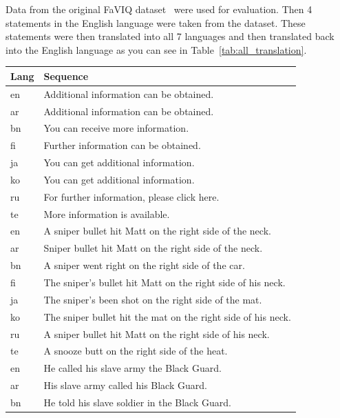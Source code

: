 Data from the original FaVIQ dataset~\cite{faviq} were used for evaluation. Then 4 statements in the English language were taken from the dataset. These statements were then translated into all 7 languages and then translated back into the English language as you can see in Table~\ref{tab:all_translation}.

\begin{table}[H]
    \centering
    \begin{tabular}{l|p{11cm}}
        \hline
        Lang & Sequence \\
        \hline
        en & Additional information can be obtained. \\
        \hline
        ar & Additional information can be obtained. \\
        bn & You can receive more information. \\
        fi & Further information can be obtained. \\
        ja & You can get additional information. \\
        ko & You can get additional information. \\
        ru & For further information, please click here. \\
        te & More information is available. \\
        \hline
        \hline
        en & A sniper bullet hit Matt on the right side of the neck. \\
        \hline
        ar & Sniper bullet hit Matt on the right side of the neck. \\
        bn & A sniper went right on the right side of the car. \\
        fi & The sniper's bullet hit Matt on the right side of his neck. \\
        ja & The sniper's been shot on the right side of the mat. \\
        ko & The sniper bullet hit the mat on the right side of his neck. \\
        ru & A sniper bullet hit Matt on the right side of his neck. \\
        te & A snooze butt on the right side of the heat. \\
        \hline
        \hline
        en & He called his slave army the Black Guard. \\
        \hline
        ar & His slave army called his Black Guard. \\
        bn & He told his slave soldier in the Black Guard. \\

\end{tabular}
\end{table}
